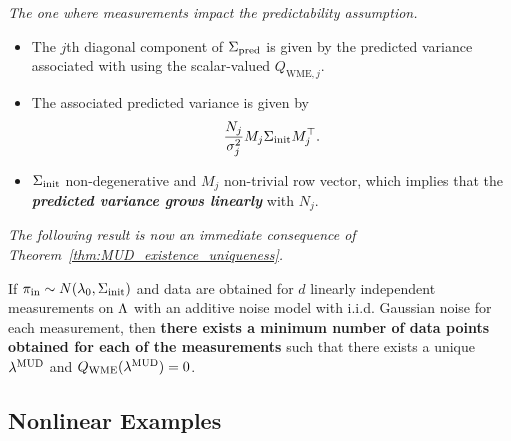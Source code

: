 \begin{frame}{\it The one where measurements impact the predictability assumption.}

\begin{itemize}
  \item The $j$th diagonal component of $\Sigma_\text{pred}$ is given by the predicted variance associated with using the scalar-valued $Q_{\text{WME},j}$.

  \bigskip
  \item The associated predicted variance is given by
  \begin{equation}
  	\frac{N_j}{\sigma_j^2} M_j\Sigma_\text{init} M_j^\top.
  \end{equation}

  \bigskip
  \item $\Sigma_\text{init}$ non-degenerative and $M_j$ non-trivial row vector, which implies that the {\it \bf predicted variance grows linearly} with $N_j$.\\

\end{itemize}

\bigskip
\bigskip
\centering
{\it The following result is now an immediate consequence of Theorem~\ref{thm:MUD_existence_uniqueness}.}
\end{frame}

\begin{frame}

\begin{corollary}\label{cor:MUD_wme}
If $\operatorname*{\pi_{in}} \sim N(\lambda_0,\Sigma_\text{init})$ and data are obtained for $d$ linearly independent measurements on ${\Lambda}$ with an additive noise model with i.i.d. Gaussian noise for each measurement, then {\bf there exists a minimum number of data points obtained for each of the measurements} such that there exists a unique $\lambda^{\text{MUD}}$ and $Q_\text{WME}(\lambda^{\text{MUD}}) = 0$.
\end{corollary}

\end{frame}



\subsection{Nonlinear Examples}

